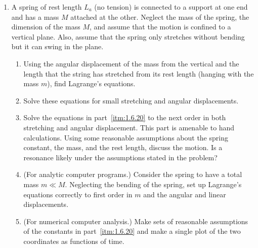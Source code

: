 \begin{enumerate}[resume]
    \item A spring of rest length \(L_a\) (no tension) is connected to a support at one end and has a mass \(M\) attached at the other. Neglect the mass of the spring, the dimension of the mass \(M\), and assume that the motion is confined to a vertical plane. Also, assume that the spring only stretches without bending but it can swing in the plane.
    \begin{enumerate}
        \item\label{itm:1.6.20} Using the angular displacement of the mass from the vertical and the length that the string has stretched from its rest length (hanging with the mass \(m\)), find Lagrange's equations.
        \item Solve these equations for small stretching and angular displacements.
        \item Solve the equations in part~\ref{itm:1.6.20} to the next order in both stretching and angular displacement. This part is amenable to hand calculations. Using some reasonable assumptions about the spring constant, the mass, and the rest length, discuss the motion. Is a resonance likely under the assumptions stated in the problem?
        \item (For analytic computer programs.) Consider the spring to have a total mass \(m\ll M\). Neglecting the bending of the spring, set up Lagrange's equations correctly to first order in \(m\) and the angular and linear displacements.
        \item (For numerical computer analysis.) Make sets of reasonable assumptions of the constants in part~\ref{itm:1.6.20} and make a single plot of the two coordinates as functions of time.
    \end{enumerate}
\end{enumerate}
